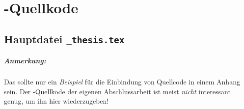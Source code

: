 \chapter{\latex-Quellkode}
\label{app:latex}

\section*{Hauptdatei \texttt{\_thesis.tex}}

\paragraph{Anmerkung:}
Das sollte nur ein \emph{Beispiel} für die Einbindung von Quellcode
in einem Anhang sein. Der \latex-Quellkode der eigenen
Abschlussarbeit ist meist \emph{nicht} interessant genug, um ihn hier
wiederzugeben!

\begin{footnotesize}

\end{footnotesize}





